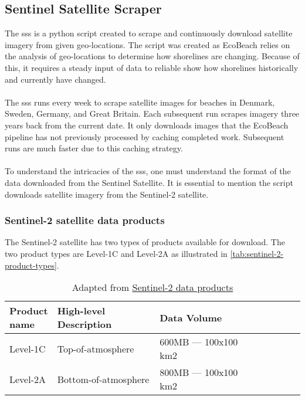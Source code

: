 \subsection{Sentinel Satellite Scraper}\label{subsec:sentinel-satellite-scraper}
The \acrfull{sss} is a python script created to scrape and continuously download satellite imagery from given geo-locations. The script was created as EcoBeach relies on the analysis of geo-locations to determine how shorelines are changing. Because of this, it requires a steady input of data to reliable show how shorelines historically and currently have changed.\\\\
\noindent
The \acrshort{sss} runs every week to scrape satellite images for beaches in Denmark, Sweden, Germany, and Great Britain. Each subsequent run scrapes imagery three years back from the current date. It only downloads images that the EcoBeach pipeline has not previously processed by caching completed work. Subsequent runs are much faster due to this caching strategy. \\\\
\noindent
To understand the intricacies of the \acrshort{sss}, one must understand the format of the data downloaded from the Sentinel Satellite. It is essential to mention the script downloads satellite imagery from the Sentinel-2 satellite.

\subsubsection{Sentinel-2 satellite data products}

The Sentinel-2 satellite has two types of products available for download. The two product types are Level-1C and Level-2A as illustrated in \autoref{tab:sentinel-2-product-types}.

\begin{table}[h!]
    \centering
    \begin{tabular}{| p{0.15\linewidth} | p{0.35\linewidth} | p{0.35\linewidth} |p{0.15\linewidth} |}
        \hline
        \textbf{Product name} & \textbf{High-level Description} & \textbf{Data Volume} \\ \hline
        Level-1C              & Top-of-atmosphere               & 600MB — 100x100 km2  \\\hline
        Level-2A              & Bottom-of-atmosphere            & 800MB — 100x100 km2  \\\hline
    \end{tabular}
    \caption{Adapted from \href{https://sentinels.copernicus.eu/web/sentinel/missions/sentinel-2/data-products}{Sentinel-2 data products}}
    \label{tab:sentinel-2-product-types}
\end{table}


